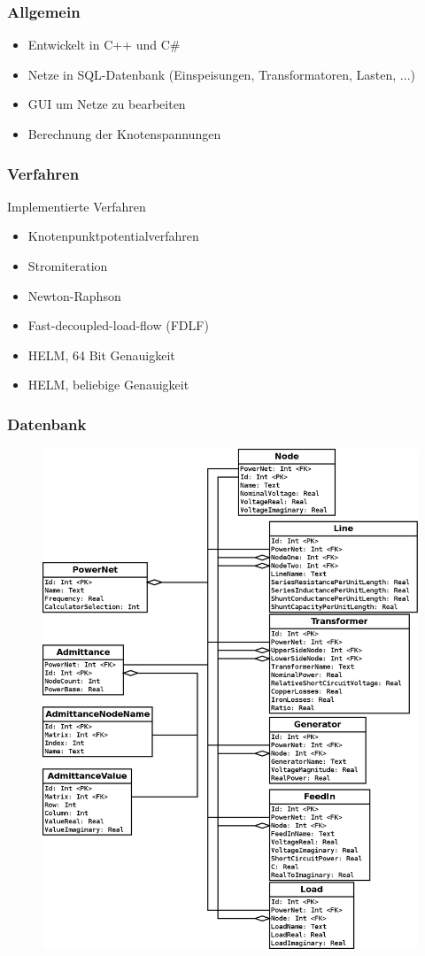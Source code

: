 \documentclass[hyperref={pdfpagelabels=false},compress]{beamer}
\begin{document}
\begin{frame}
	\frametitle{Allgemein}
	\begin{itemize}
		\item Entwickelt in C++ und C\#
		\item Netze in SQL-Datenbank (Einspeisungen, Transformatoren, Lasten, ...)
		\item GUI um Netze zu bearbeiten
		\item Berechnung der Knotenspannungen
	\end{itemize}
\end{frame}

\begin{frame}
	\frametitle{Verfahren}
	Implementierte Verfahren
	\begin{itemize}
		\item Knotenpunktpotentialverfahren
		\item Stromiteration
		\item Newton-Raphson
		\item Fast-decoupled-load-flow (FDLF)
		\item HELM, 64 Bit Genauigkeit
		\item HELM, beliebige Genauigkeit
	\end{itemize}
\end{frame}

\begin{frame}
	\frametitle{Datenbank}	
	\begin{figure}
		\centering
		\includegraphics[scale=0.15]{pictures/database_schema}
	\end{figure}
\end{frame}
\end{document}
